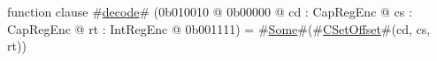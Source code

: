 function clause #\hyperref[zdecode]{decode}# (0b010010 @ 0b00000 @ cd : CapRegEnc @ cs : CapRegEnc @ rt : IntRegEnc @ 0b001111) = #\hyperref[zSome]{Some}#(#\hyperref[zCSetOffset]{CSetOffset}#(cd, cs, rt))
